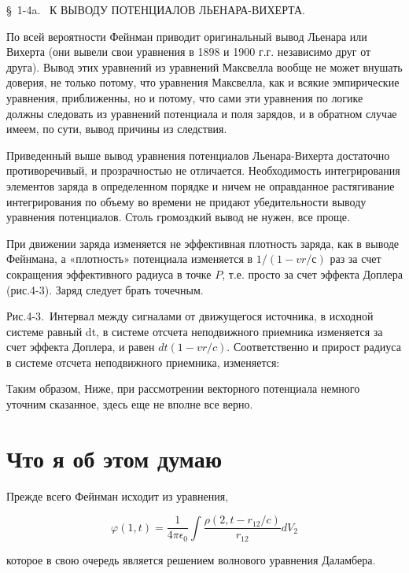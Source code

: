 \documentclass{article}
\begin{document}
§ 1-4a.  К ВЫВОДУ ПОТЕНЦИАЛОВ ЛЬЕНАРА-ВИХЕРТА.

По всей вероятности Фейнман приводит оригинальный вывод Льенара или Вихерта (они вывели свои уравнения в 1898 и 1900 г.г. независимо друг от друга). Вывод этих уравнений из уравнений Максвелла вообще не может внушать доверия, не только потому, что уравнения Максвелла, как и всякие эмпирические уравнения, приближенны, но и потому, что сами эти уравнения по логике должны следовать из уравнений потенциала и поля зарядов, и в обратном случае имеем, по сути, вывод причины из следствия. 

Приведенный выше вывод уравнения потенциалов Льенара-Вихерта достаточно противоречивый, и прозрачностью не отличается. Необходимость интегрирования элементов заряда в определенном порядке и ничем не оправданное растягивание интегрирования по объему во времени не придают убедительности выводу уравнения потенциалов. Столь громоздкий вывод не нужен, все проще. 

При движении заряда изменяется не эффективная плотность заряда, как в выводе Фейнмана, а «плотность» потенциала изменяется в $1/(1 - vr /с)$ раз за счет сокращения эффективного радиуса в точке $P$, т.е. просто за счет эффекта Доплера (рис.4-3). Заряд следует брать точечным. 


Рис.4-3. Интервал между сигналами от движущегося источника, в исходной системе равный dt, в системе отсчета неподвижного приемника изменяется за счет эффекта Доплера, и равен $dt (1 - vr /c)$. Соответственно и прирост радиуса в системе отсчета неподвижного приемника, изменяется: %

Таким образом,
Ниже, при рассмотрении векторного потенциала немного уточним сказанное, здесь еще не вполне все верно.


\section{Что я об этом думаю}

Прежде всего Фейнман исходит из уравнения, 

$$\varphi(1,t) = \frac{1}{4\pi\epsilon_0}\int\frac{\rho(2,t-r_{12}/c)}{r_{12}}dV_{2}$$

которое в свою очередь является решением волнового уравнения Даламбера.

\end{document}
